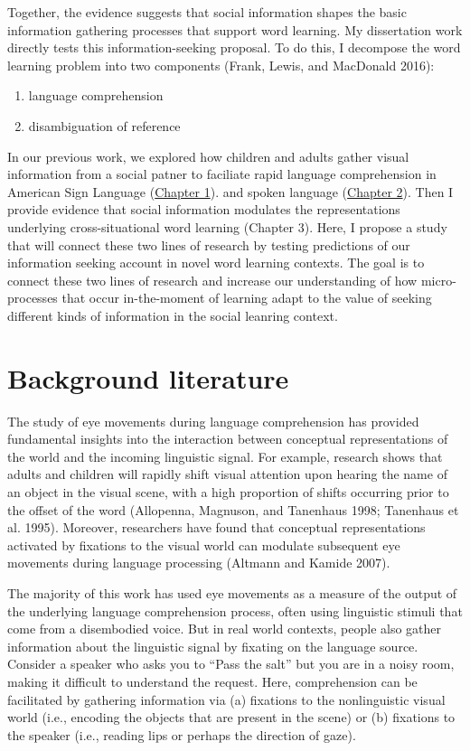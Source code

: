 \documentclass[]{elsarticle} %
\providecommand{\tightlist}{%
  \setlength{\itemsep}{0pt}\setlength{\parskip}{0pt}}
\begin{document}
Together, the evidence suggests that social information shapes the basic
information gathering processes that support word learning. My
dissertation work directly tests this information-seeking proposal. To
do this, I decompose the word learning problem into two components
(Frank, Lewis, and MacDonald 2016):

\begin{enumerate}
\def\labelenumi{\arabic{enumi}.}
\tightlist
\item
  language comprehension
\item
  disambiguation of reference
\end{enumerate}

In our previous work, we explored how children and adults gather visual
information from a social patner to faciliate rapid language
comprehension in American Sign Language (\protect\hyperlink{ch1}{Chapter
1}). and spoken language (\href{ch2}{Chapter 2}). Then I provide
evidence that social information modulates the representations
underlying cross-situational word learning (Chapter 3). Here, I propose
a study that will connect these two lines of research by testing
predictions of our information seeking account in novel word learning
contexts. The goal is to connect these two lines of research and
increase our understanding of how micro-processes that occur
in-the-moment of learning adapt to the value of seeking different kinds
of information in the social leanring context.

\section{Background literature}\label{background-literature}

The study of eye movements during language comprehension has provided
fundamental insights into the interaction between conceptual
representations of the world and the incoming linguistic signal. For
example, research shows that adults and children will rapidly shift
visual attention upon hearing the name of an object in the visual scene,
with a high proportion of shifts occurring prior to the offset of the
word (Allopenna, Magnuson, and Tanenhaus 1998; Tanenhaus et al. 1995).
Moreover, researchers have found that conceptual representations
activated by fixations to the visual world can modulate subsequent eye
movements during language processing (Altmann and Kamide 2007).

The majority of this work has used eye movements as a measure of the
output of the underlying language comprehension process, often using
linguistic stimuli that come from a disembodied voice. But in real world
contexts, people also gather information about the linguistic signal by
fixating on the language source. Consider a speaker who asks you to
``Pass the salt'' but you are in a noisy room, making it difficult to
understand the request. Here, comprehension can be facilitated by
gathering information via (a) fixations to the nonlinguistic visual
world (i.e., encoding the objects that are present in the scene) or (b)
fixations to the speaker (i.e., reading lips or perhaps the direction of
gaze).
\end{document}
